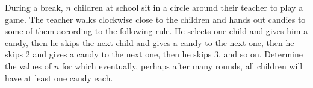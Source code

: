 During a break, $n$ children at school sit in a circle around their teacher to play a game.  The teacher walks clockwise close to the children and hands out candies to some of them according to the following rule. He selects one child and gives him a candy, then he skips the next child and gives a candy to the next one, then he skips 2 and gives a candy to the next one, then he skips 3, and so on. Determine the values of $n$ for which eventually, perhaps after many rounds, all children will have at least one candy each.